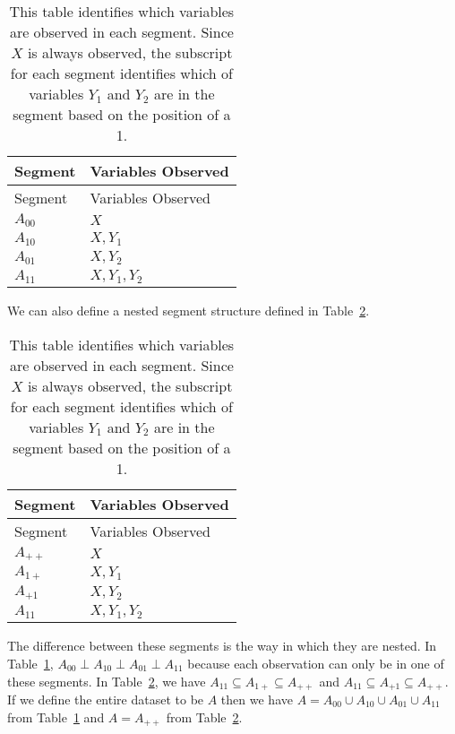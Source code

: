 \documentclass[
  letterpaper,
  DIV=11,
  numbers=noendperiod]{scrartcl}
\begin{document}
\hypertarget{tbl-vars1}{}
\begin{longtable}[]{@{}ll@{}}
\caption{\label{tbl-vars1}This table identifies which variables are
observed in each segment. Since \(X\) is always observed, the subscript
for each segment identifies which of variables \(Y_1\) and \(Y_2\) are
in the segment based on the position of a 1.}\tabularnewline
\toprule\noalign{}
Segment & Variables Observed \\
\midrule\noalign{}
\endfirsthead
\toprule\noalign{}
Segment & Variables Observed \\
\midrule\noalign{}
\endhead
\bottomrule\noalign{}
\endlastfoot
\(A_{00}\) & \(X\) \\
\(A_{10}\) & \(X, Y_1\) \\
\(A_{01}\) & \(X, Y_2\) \\
\(A_{11}\) & \(X, Y_1, Y_2\) \\
\end{longtable}

We can also define a nested segment structure defined in
Table~\ref{tbl-vars2}.

\hypertarget{tbl-vars2}{}
\begin{longtable}[]{@{}ll@{}}
\caption{\label{tbl-vars2}This table identifies which variables are
observed in each segment. Since \(X\) is always observed, the subscript
for each segment identifies which of variables \(Y_1\) and \(Y_2\) are
in the segment based on the position of a 1.}\tabularnewline
\toprule\noalign{}
Segment & Variables Observed \\
\midrule\noalign{}
\endfirsthead
\toprule\noalign{}
Segment & Variables Observed \\
\midrule\noalign{}
\endhead
\bottomrule\noalign{}
\endlastfoot
\(A_{++}\) & \(X\) \\
\(A_{1+}\) & \(X, Y_1\) \\
\(A_{+1}\) & \(X, Y_2\) \\
\(A_{11}\) & \(X, Y_1, Y_2\) \\
\end{longtable}

The difference between these segments is the way in which they are
nested. In Table~\ref{tbl-vars1},
\(A_{00} \perp A_{10} \perp A_{01} \perp A_{11}\) because each
observation can only be in one of these segments. In
Table~\ref{tbl-vars2}, we have
\(A_{11} \subseteq A_{1+} \subseteq A_{++}\) and
\(A_{11} \subseteq A_{+1} \subseteq A_{++}\). If we define the entire
dataset to be \(A\) then we have
\(A = A_{00} \cup A_{10} \cup A_{01} \cup A_{11}\) from
Table~\ref{tbl-vars1} and \(A = A_{++}\) from Table~\ref{tbl-vars2}.
\end{document}
